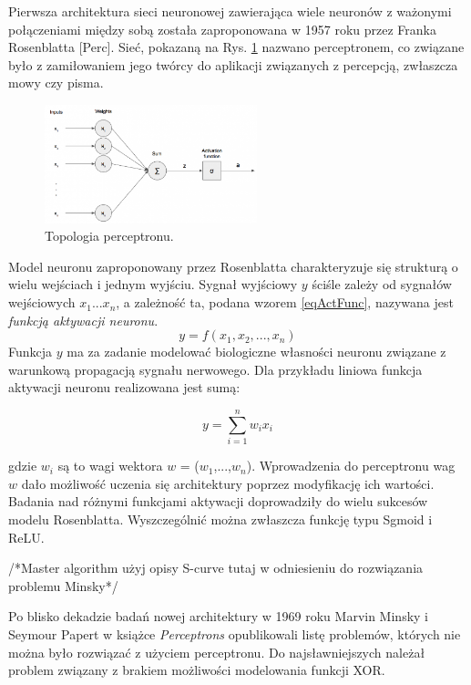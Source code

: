 Pierwsza architektura sieci neuronowej zawierająca wiele neuronów z ważonymi połączeniami między sobą została zaproponowana w 1957 roku przez Franka Rosenblatta [Perc]. Sieć, pokazaną na Rys. \ref{Perceptron} nazwano perceptronem, co związane było z zamiłowaniem jego twórcy do aplikacji związanych z percepcją, zwłaszcza mowy czy pisma. 
\begin{figure}[h!]
	\centering
	\includegraphics[width=0.55\textwidth]{figures/perceptron.png}
	\caption{Topologia perceptronu.}
	\label{Perceptron}
\end{figure}

Model neuronu zaproponowany przez Rosenblatta charakteryzuje się strukturą o wielu wejściach i jednym wyjściu. Sygnał wyjściowy $y$ ściśle zależy od sygnałów wejściowych $x_1$...$x_n$, a zależność ta, podana wzorem \ref{eqActFunc}, nazywana jest \textit{funkcją aktywacji neuronu}. 
\begin{equation}
\label{eqActFunc}
y=f\left(x_1, x_2,..., x_n\right)
\end{equation}
Funkcja $y$ ma za zadanie modelować biologiczne własności neuronu związane z warunkową propagacją sygnału nerwowego. Dla przykładu liniowa funkcja aktywacji neuronu realizowana jest sumą:

\begin{equation}
\label{eqLinActFunc}
y=\sum_{i=1}^{n}w_i x_i
\end{equation}

gdzie $w_i$ są to wagi wektora $w$ = ($w_1$,...,$w_n$). Wprowadzenia do perceptronu wag $w$ dało możliwość uczenia się architektury poprzez modyfikację ich wartości. Badania nad różnymi funkcjami aktywacji doprowadziły do wielu sukcesów modelu Rosenblatta. Wyszczególnić można zwłaszcza funkcję typu Sgmoid i ReLU.

/*Master algorithm użyj opisy S-curve tutaj w odniesieniu do rozwiązania problemu Minsky*/

Po blisko dekadzie badań nowej architektury w 1969 roku Marvin Minsky i Seymour Papert w książce \textit{Perceptrons} opublikowali listę problemów, których nie można było rozwiązać z użyciem perceptronu. Do najsławniejszych należał problem związany z brakiem możliwości modelowania funkcji XOR.

